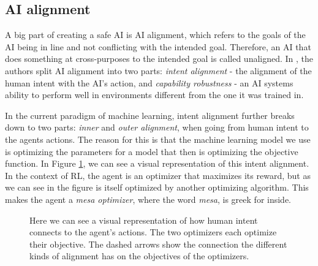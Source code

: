 \documentclass[12pt,A4]{report}
\theoremstyle{definition}
\begin{document}
\subsection{AI alignment}


A big part of creating a safe AI is AI alignment, which refers to the goals of the AI being in line and not conflicting with the intended goal. Therefore, an AI that does something at cross-purposes to the intended goal is called unaligned. In \citet{Hubringer}, the authors split AI alignment into two parts: \textit{intent alignment} - the alignment of the human intent with the AI's action, and \textit{capability robustness} - an AI systems ability to perform well in environments different from the one it was trained in. 

In the current paradigm of machine learning, intent alignment further breaks down to two parts: \textit{inner} and \textit{outer alignment}, when going from human intent to the agents actions. The reason for this is that the machine learning model we use is optimizing the parameters for a model that then is optimizing the objective function. In Figure \ref{fig:alignment}, we can see a visual representation of this intent alignment. In the context of RL, the agent is an optimizer that maximizes its reward, but as we can see in the figure is itself optimized by another optimizing algorithm. This makes the agent a \textit{mesa optimizer}, where the word \textit{mesa}, is greek for inside. 

\begin{figure}[H]
  
  \caption{Here we can see a visual representation of how human intent connects to the agent's actions. The two optimizers each optimize their objective. The dashed arrows show the connection the different kinds of alignment has on the objectives of the optimizers.}
  \label{fig:alignment}
\end{figure}
\end{document}
